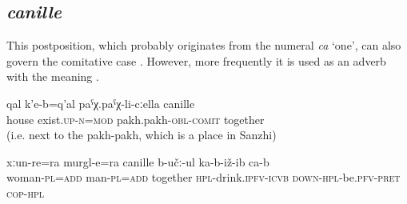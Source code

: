 \subsection{\textit{canille} }
\label{ssec:postposition canille}

This postposition, which probably originates from the numeral \textit{ca} `one', can also govern the comitative case . However, more frequently it is used as an adverb with the meaning  .
%
\begin{exe}
	\ex	\label{ex:There is a house together with the pakh-pakh}
	\gll	qal	k'e-b=q'al	paˁχ.paˁχ-li-cːella	canille  \\
		house	exist.\textsc{up}-\textsc{n}=\textsc{mod}	pakh.pakh-\textsc{obl}-\textsc{comit}	together\\
	\glt	{} (i.e. next to the pakh-pakh, which is a place in Sanzhi)

	\ex	\label{ex:Men and women are sitting together and drinking}
	\gll	xːun-re=ra	murgl-e=ra	canille	b-učː-ul	ka-b-iž-ib	ca-b  \\
		woman-\textsc{pl}=\textsc{add}	man-\textsc{pl}=\textsc{add}	together	\textsc{hpl}-drink.\textsc{ipfv}-\textsc{icvb}	\textsc{down-hpl}-be.\textsc{pfv}-\textsc{pret}	\textsc{cop-hpl}\\
	\glt	{}
\end{exe}



\subsection{ }
\label{ssec:postposition bahanne}

